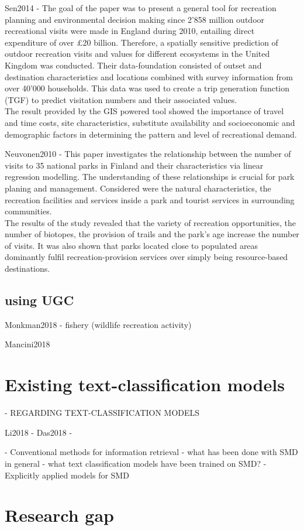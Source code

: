 Sen2014 - The goal of the paper was to present a general tool for recreation planning and environmental decision making since 2'858 million outdoor recreational visits were made in England during 2010, entailing direct expenditure of over £20 billion. Therefore, a spatially sensitive prediction of outdoor recreation visits and values for different ecosystems in the United Kingdom was conducted. Their data-foundation consisted of outset and destination characteristics and locations combined with survey information from over 40'000 households. This data was used to create a trip generation function (TGF) to predict visitation numbers and their associated values.\\
The result provided by the GIS powered tool showed the importance of travel and time costs, site characteristics, substitute availability and socioeconomic and demographic factors in determining the pattern and level of recreational demand.

Neuvonen2010 - This paper investigates the relationship between the number of visits to 35 national parks in Finland and their characteristics via linear regression modelling. The understanding of these relationships is crucial for park planing and management. Considered were the natural characteristics, the recreation facilities and services inside a park and tourist services in surrounding communities. \\
The results of the study revealed that the variety of recreation opportunities, the number of biotopes, the provision of trails and the park's age increase the number of visits. It was also shown that parks located close to populated areas dominantly fulfil recreation-provision services over simply being resource-based destinations.

\subsection{using UGC}

Monkman2018 - fishery (wildlife recreation activity)

Mancini2018
    
\section{Existing text-classification models}
    - REGARDING TEXT-CLASSIFICATION MODELS
    
Li2018 - 
Das2018 - 





    - Conventional methods for information retrieval 
    - what has been done with SMD in general
    - what text classification models have been trained on SMD?
    - Explicitly applied models for SMD    







\section{Research gap}